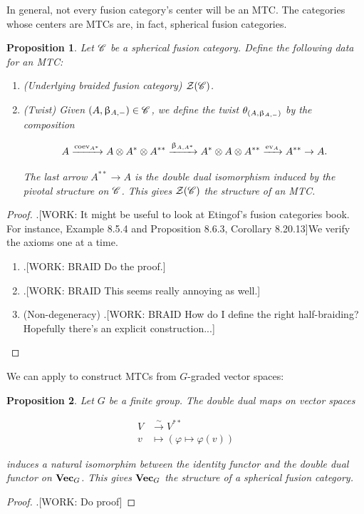 \documentclass{article}
\newtheorem{proposition}{Proposition}[section]
\theoremstyle{definition}
\numberwithin{figure}{section}
\begin{document}
In general, not every fusion category's center will be an MTC. The categories whose centers are MTCs are, in fact, spherical fusion categories.

\begin{proposition}\label{spherical-center-modular} Let $\mathscr{C}$ be a spherical fusion category. Define the following data for an MTC:

\begin{enumerate}
\item (Underlying braided fusion category) $\mathcal{Z}(\mathscr{C})$.
\item (Twist) Given $(A,\upbeta_{A,\--})\in \mathscr{C}$, we define the twist $\theta_{(A,\upbeta_{A,\--})}$ by the composition

$$A\xrightarrow{\mathrm{coev}_{A^*}} A\otimes A^*\otimes A^{**}\xrightarrow{\upbeta_{A,A^*}} A^*\otimes A \otimes A^{**}\xrightarrow{\mathrm{ev}_{A}} A^{**}\to A.$$

The last arrow $A^{**}\to A$ is the double dual isomorphism induced by the pivotal structure on $\mathscr{C}$. This gives $\mathcal{Z}(\mathscr{C})$ the structure of an MTC.
\end{enumerate}

\end{proposition}
\begin{proof} .[WORK: It might be useful to look at Etingof's fusion categories book. For instance, Example 8.5.4 and Proposition 8.6.3, Corollary 8.20.13]We verify the axioms one at a time.

\begin{enumerate}
\item .[WORK: BRAID Do the proof.]

\item .[WORK: BRAID This seems really annoying as well.]

\item (Non-degeneracy) .[WORK: BRAID How do I define the right half-braiding? Hopefully there's an explicit construction...]
\end{enumerate}
\end{proof}

We can apply to construct MTCs from $G$-graded vector spaces:

\begin{proposition} Let $G$ be a finite group. The double dual maps on vector spaces

\begin{align*}
V&\xrightarrow{\sim}V^{**}\\
v&\mapsto (\varphi\mapsto \varphi(v))
\end{align*}

induces a natural isomorphim between the identity functor and the double dual functor on $\bold{Vec}_G$. This gives $\bold{Vec}_G$ the structure of a spherical fusion category.
\end{proposition}
\begin{proof}.[WORK: Do proof]
\end{proof}
\end{document}
